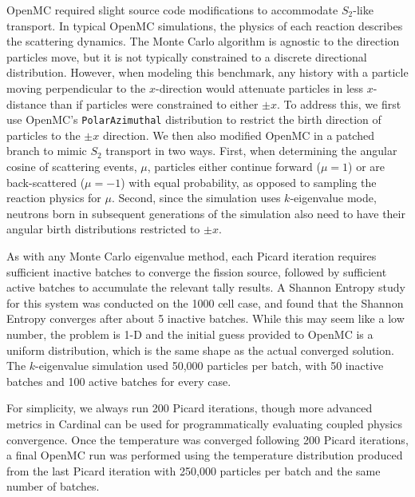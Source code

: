 \documentclass[letterpaper]{mc2023}
\begin{document}
OpenMC required slight source code modifications to accommodate $S_2$-like transport. In typical OpenMC simulations,
the physics of each reaction describes the scattering dynamics. The Monte Carlo algorithm is agnostic to the direction
particles move, but it is not typically constrained to a discrete directional distribution. However, when modeling this
benchmark, any history with a particle moving perpendicular to the $x$-direction would attenuate particles in less
$x$-distance than if particles were constrained to either $\pm x$. To address this, we first use OpenMC's \texttt{PolarAzimuthal}
distribution to restrict the birth direction of particles to the $\pm x$ direction. We then also modified OpenMC in a
patched branch to mimic $S_{2}$ transport in two ways. First, when determining the angular cosine of scattering events,
$\mu$, particles either continue forward ($\mu=1$) or are back-scattered ($\mu=-1$) with equal probability, as opposed to
sampling the reaction physics for $\mu$. Second, since the simulation uses $k$-eigenvalue mode, neutrons born in subsequent
generations of the simulation also need to have their angular birth distributions restricted to $\pm x$.

As with any Monte Carlo eigenvalue method, each Picard iteration requires sufficient inactive batches to converge the fission source,
followed by sufficient active batches to accumulate the relevant tally results. A Shannon Entropy \cite{brown-entropy-2006} study for
this system was conducted on the 1000 cell case, and found that the Shannon Entropy converges after about 5 inactive batches. While this
may seem like a low number, the problem is 1-D and the initial guess provided to OpenMC is a uniform distribution, which is the same
shape as the actual converged solution. The $k$-eigenvalue simulation used 50,000 particles per batch, with 50 inactive batches and
100 active batches for every case.

For simplicity, we always run 200 Picard iterations, though more advanced metrics in Cardinal can be used for programmatically
evaluating coupled physics convergence. Once the temperature was converged following 200 Picard iterations, a final OpenMC run was
performed using the temperature distribution produced from the last Picard iteration with 250,000 particles per batch and the same
number of batches.
\end{document}
